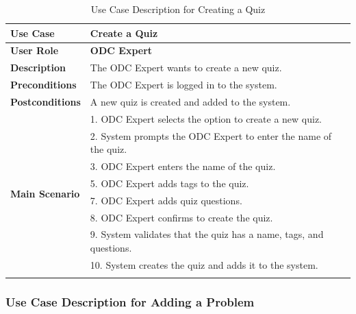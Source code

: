 \normalsize
\begin{longtable}{|p{3cm}|p{12cm}|}
  \hline
  \rowcolor{green!20} \textbf{Use Case}    & \textbf{Create a Quiz}                                             \\ \hline
  \textbf{User Role}                       & \textbf{ODC Expert}                                                \\ \hline
  \textbf{Description}                     & The ODC Expert wants to create a new quiz.                         \\ \hline
  \textbf{Preconditions}                   & The ODC Expert is logged in to the system.                         \\ \hline
  \textbf{Postconditions}                  & A new quiz is created and added to the system.                     \\ \hline
  \multirow{10}{*}{\textbf{Main Scenario}} &
  1. ODC Expert selects the option to create a new quiz.                                                        \\ \cline{2-2}
                                           & 2. System prompts the ODC Expert to enter the name of the quiz.    \\ \cline{2-2}
                                           & 3. ODC Expert enters the name of the quiz.                         \\ \cline{2-2}
                                           & 5. ODC Expert adds tags to the quiz.                               \\ \cline{2-2}
                                           & 7. ODC Expert adds quiz questions.                                 \\ \cline{2-2}
                                           & 8. ODC Expert confirms to create the quiz.                         \\ \cline{2-2}
                                           & 9. System validates that the quiz has a name, tags, and questions. \\ \cline{2-2}
                                           & 10. System creates the quiz and adds it to the system.             \\ \hline
  \caption{Use Case Description for Creating a Quiz}\label{tab:create_quiz_use_case}
\end{longtable}

\subsubsection{Use Case Description for Adding a Problem}

